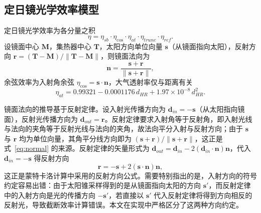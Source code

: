 \documentclass[12pt]{ctexart}
\begin{document}
\subsection{定日镜光学效率模型}
定日镜光学效率为各分量之积
\begin{equation}
\eta=\eta_{sb}\cdot\eta_{\cos}\cdot\eta_{at}\cdot\eta_{trunc}\cdot\eta_{ref}.
\end{equation}
设镜面中心 $\mathbf{M}$，集热器中心 $\mathbf{T}$，太阳方向单位向量 $\mathbf{s}$（从镜面指向太阳），反射方向 $\mathbf{r}=(\mathbf{T}-\mathbf{M})/\|\mathbf{T}-\mathbf{M}\|$，则镜面法向为
\begin{equation}
\mathbf{n}=\frac{\mathbf{s}+\mathbf{r}}{\|\mathbf{s}+\mathbf{r}\|},
\label{eq:normal}
\end{equation}
余弦效率为入射角余弦 $\eta_{\cos}=\mathbf{s}\cdot\mathbf{n}$，大气透射率仅与距离有关
\begin{equation}
\eta_{at}=0.99321-0.0001176\,d_{HR}+1.97\times10^{-8}\,d_{HR}^2.
\end{equation}

镜面法向的推导基于反射定律。设入射光传播方向为 $\mathbf{d}_{in}=-\mathbf{s}$（从太阳指向镜面），反射光传播方向为 $\mathbf{d}_{out}=\mathbf{r}$。反射定律要求入射角等于反射角，即入射光线与法向的夹角等于反射光线与法向的夹角，故法向平分入射与反射方向；由于 $\mathbf{s}$ 与 $\mathbf{r}$ 均为单位向量，其角平分线方向即为 $(\mathbf{s}+\mathbf{r})/\|\mathbf{s}+\mathbf{r}\|$，这正是式~\eqref{eq:normal} 的来源。反射定律的矢量形式为 $\mathbf{d}_{out}=\mathbf{d}_{in}-2(\mathbf{d}_{in}\cdot\mathbf{n})\mathbf{n}$，代入 $\mathbf{d}_{in}=-\mathbf{s}$ 得反射方向
\begin{equation}
\mathbf{r}=-\mathbf{s}+2(\mathbf{s}\cdot\mathbf{n})\mathbf{n},
\end{equation}
这正是蒙特卡洛计算中采用的反射方向公式。需要特别指出的是，入射方向的符号约定容易出错：由于太阳锥采样得到的是从镜面指向太阳的方向 $\mathbf{s}'$，而反射定律中的入射方向是光的传播方向 $-\mathbf{s}'$，若直接以 $\mathbf{s}'$ 代入反射定律将得到方向相反的反射光，导致截断效率计算错误。本文在实现中严格区分了这两种方向约定。
\end{document}
